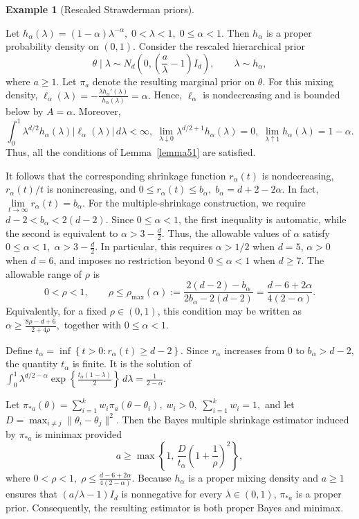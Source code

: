 \documentclass[11pt]{article}
\theoremstyle{definition}
\newtheorem{example}{Example}
\begin{document}
\begin{example}[Rescaled Strawderman priors]
\label{ex:rescaled-strawderman}

Let $h_\alpha(\lambda) = (1-\alpha)\lambda^{-\alpha},
\; 0<\lambda<1,\;0\leq \alpha<1.$ Then $h_\alpha$ is a proper probability density on $(0,1)$.
Consider the rescaled hierarchical prior
\[
\theta\mid\lambda
\sim
N_d\left(
0,
\left(\frac{a}{\lambda}-1\right)I_d
\right),
\qquad
\lambda\sim h_\alpha,
\]
where $a\geq1$. Let $\pi_a$ denote the resulting marginal prior
on $\theta$. For this mixing density, $\ell_\alpha(\lambda)
=
-\frac{\lambda h_\alpha'(\lambda)}
       {h_\alpha(\lambda)}
=
\alpha.$ Hence, $\ell_\alpha$ is nondecreasing and is bounded below by
$A=\alpha$. Moreover,
\[
\int_0^1
\lambda^{d/2}h_\alpha(\lambda)
|\ell_\alpha(\lambda)|\,d\lambda
<\infty,\; \lim_{\lambda\downarrow0}
\lambda^{d/2+1}h_\alpha(\lambda)=0,
\;
\lim_{\lambda\uparrow1}h_\alpha(\lambda)=1-\alpha.
\]
Thus, all the conditions of Lemma~\ref{lemma51}
are satisfied.

It follows that the corresponding shrinkage function
$r_\alpha(t)$ is nondecreasing, $r_\alpha(t)/t$ is
nonincreasing, and $0\leq r_\alpha(t)\leq b_\alpha,
\; b_\alpha=d+2-2\alpha.$ In fact, $\lim\limits_{t\to\infty}r_\alpha(t)=b_\alpha.$ For the multiple-shrinkage construction, we require $d-2<b_\alpha<2(d-2).$ Since $0\leq\alpha<1$, the first inequality is automatic, while
the second is equivalent to $\alpha>3-\frac d2.$ Thus, the allowable values of $\alpha$ satisfy $0\leq\alpha<1,
\; \alpha>3-\frac d2.$
In particular, this requires $\alpha>1/2$ when $d=5$,
$\alpha>0$ when $d=6$, and imposes no restriction beyond
$0\leq\alpha<1$ when $d\geq7$. The allowable range of $\rho$ is
\[
0<\rho<1,
\qquad
\rho\leq
\rho_{\max}(\alpha)
:=
\frac{2(d-2)-b_\alpha}
     {2b_\alpha-2(d-2)}
=
\frac{d-6+2\alpha}{4(2-\alpha)}.
\]
Equivalently, for a fixed $\rho\in(0,1)$, this condition may be written as $\alpha
\geq
\frac{8\rho-d+6}{2+4\rho},$ together with $0\leq\alpha<1$.

Define $t_\alpha = \inf\left\{
t>0:r_\alpha(t)\geq d-2
\right\}.$ Since $r_\alpha$ increases from $0$ to
$b_\alpha>d-2$, the quantity $t_\alpha$ is finite. It is the
solution of $\int_0^1
\lambda^{d/2-\alpha}
\exp\left\{
\frac{t_\alpha(1-\lambda)}{2}
\right\}
\,d\lambda
=
\frac{1}{2-\alpha}.$

Let $\pi_{*a}(\theta)
=
\sum\limits_{i=1}^k
w_i\pi_a(\theta-\theta_i),
\;
w_i>0,
\;
\sum\limits_{i=1}^k w_i=1,$ and let $D
=
\max_{i\neq j}
\|\theta_i-\theta_j\|^2.$ Then the Bayes multiple shrinkage estimator induced by
$\pi_{*a}$ is minimax provided
\[
a
\geq
\max\left\{
1,\,
\frac{D}{t_\alpha}
\left(1+\frac{1}{\rho}\right)^2
\right\},
\]
where $0<\rho<1,
\;
\rho\leq
\frac{d-6+2\alpha}{4(2-\alpha)}.$ Because $h_\alpha$ is a proper mixing density and $a\geq1$
ensures that $(a/\lambda-1)I_d$ is nonnegative for every
$\lambda\in(0,1)$, $\pi_{*a}$ is a proper prior. Consequently,
the resulting estimator is both proper Bayes and minimax.
\end{example}
\end{document}
